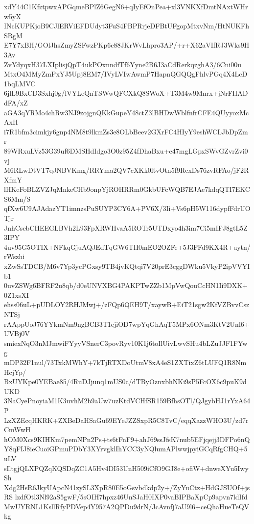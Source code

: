 xdY44C1KfztpwxAPGqmeBPlZ6GegN6+qIyEfOnPea+xl3VNKXfDmtNAxtWHrw5yX
INcKUPKjoB9CJlERViEFDUdyt3FuS4FBPRrjeDFBtUFgopMtxvNm/HtNUKFhSRgM
E7Y7xBH/GOlJhsZmyZSFwzPKp6c88JKrWvLhpro3AP/+r+X62aVIfRJ3Wks9H3Av
ZvYdyqxH37LXIplisjQpT4ukPOxnndfTf6Yyne2B6J3aCdRerkqzghA3/6Cni00u
MtxO4MMyZmPxYJ5Upj8EM7/IVyLVIwAwmP7HapnQGQQgFhlvPGq4X4LcD1bqLMVC
6jlL9BxCD3Sxhj0g/lVYLeQnTSWwQFCXkQ8SWoX+T3M4w9Mnrx+jNrFHADdFA/xZ
aGA3qYRMo4chRw3NJ9zojgnQKkGupeY48ctZ3lBHDwWblfnfrCFE4QUyyoxMcAxH
i7R1bfm3cimkjy6gnp4NM8t9lkmZs3e8OLbBeev2GXrFC4HIyY9eshWCLJbDpZmr
89WRxuLVz53G39uf6DMSHdIdgo3O0z95Z4fDhaBxu+e47mgLGpxSWvGZvrZvi0vj
M6RLwDtVT7qJNBVKmg/RRYma2QV7cXKk0ltvOtn5f9RexDs76zvRFAo/jF2RXfmY
lHKeFoBLZVZJqMnkeCHb9onpYjROHRRm0GkbUFcWQB7EJAe7kdqQTI7EKCS6Mm/S
qfXw6U9AJAdazYT1imnzsPuSUYP3CY6A+PV6X/3Ii+Vs6pH5W116dypfFdrUOTjr
JnhCsebCHEEGLBVh2L93FpXRWHvaA5ROTr5UTDxyo4h3im7Ci5mIFJ8gtL5Z3IPY
4uv95G5OTIX+NFkqGjuAQJEdTqGW6TH0mEO2OZFe+5J3FFd9KX4R+uytn/rWszhi
xZwSsTDCB/M6v7Yp3ycPGxsy9TB4jvKQtqi7V20prE3cggDWku5VkyP2ipVVYIb1
0uvZSWg6BFRF2u8qb/d0eUNVXBG4PAKPTwZZb1MpVwQouCcHN1Ii9DXK+0Z1xsXI
ehss06uL+pUDLOY2RHJMwj+/zFQp6QEH9T/xaywB+EiT21sgw2KfVZBvvCszNTSj
rAAppUoJ76YYkmNm9ngBCB3T1ejiOD7wpYqGhAqT5MPx6ONm3KtV2Unl6+UVBj0V
smiexNqO3nMJmwiFYyyVSnerC3povRyv10K1j6toIlUivLwvSHu4bLZuJJF1FYwg
mDP32F1nul/73TxkMWhY+7kTjRTXDoUtmV8xA4eS1ZXTixZ6tLUFQ1R8NmHcjYp/
BxUYKpe0YEBae85/4RuDJjunq1mUS0c/dTByOznxbhNKi9sP5FcOX6c9puK9dUKD
3NaCyePnoyiaM1K3uvhM2b9aUw7uzKtdVCHfSR159BfhsOTl/QJgybHJ1rYxA64P
LzXZEcqHKRK+ZXBeDaHSaGu69EYeJZZSxpR5C8TvC/eqqXazzWHO3U/zd7rCmWwH
hOM0Xcs9KIHKm7pemNPn2Ps+ts6tFnF9+ahJ69ssJfsK7nub5EFjqejj3DFPo6nQ
Y8qFIJ8ieCuoiGPmuPDbY3XYrvgklIhYCC3yNQlumAPlwwjpyiGCqRfgCHQ+5uLV
sIltgjQLXPQZqKQSDqZC1A5Hv4DI53UnH509iCfO9GJ8e+ofiW+dnweXYu5IwySh
Xdg2HsR6JkyUApcN41zySL3XpR80E5oGsvbdkdp2y+/ZyYuCtz+HdGJSUOf+jsRS
lzdfOtl3Nl92aS5gwF/5sOIH7hpxz46UnSJaH0IXP0vaBIPBaXpCp9apvn7ldIfd
MwUYRNL1KsllRfyPDVep4Y957A2QPDu9drN/JcAvnfj7aU9l6+ceQhaHueTeQVkg
